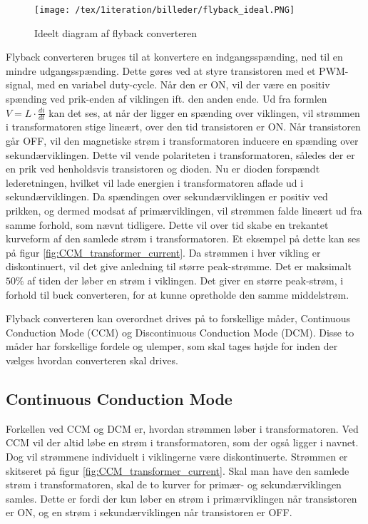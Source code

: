 \begin{figure}[H]
	\center
	\texttt{[image: /tex/1iteration/billeder/flyback\_ideal.PNG]}
	\caption{Ideelt diagram af flyback converteren
	\cite{SMPS-topologies}}
	\label{fig:flyback_ideal}
\end{figure} 

\noindent Flyback converteren bruges til at konvertere en indgangsspænding, ned til en mindre udgangsspænding. Dette gøres ved at styre transistoren med et PWM-signal, med en variabel duty-cycle. Når den er ON, vil der være en positiv spænding ved prik-enden af viklingen ift. den anden ende. Ud fra formlen $V=L\cdot \frac{di}{dt}$ kan det ses, at når der ligger en spænding over viklingen, vil strømmen i transformatoren stige lineært, over den tid transistoren er ON. Når transistoren går OFF, vil den magnetiske strøm i transformatoren inducere en spænding over sekundærviklingen. Dette vil vende polariteten i transformatoren, således der er en prik ved henholdsvis transistoren og dioden. Nu er dioden forspændt lederetningen, hvilket vil lade energien i transformatoren aflade ud i sekundærviklingen. Da spændingen over sekundærviklingen er positiv ved prikken, og dermed modsat af primærviklingen, vil strømmen falde lineært ud fra samme forhold, som nævnt tidligere. Dette vil over tid skabe en trekantet kurveform af den samlede strøm i transformatoren. Et eksempel på dette kan ses på figur \ref{fig:CCM_transformer_current}. Da strømmen i hver vikling er diskontinuert, vil det give anledning til større peak-strømme. Det er maksimalt $50\percent$ af tiden der løber en strøm i viklingen. Det giver en større peak-strøm, i forhold til buck converteren, for at kunne opretholde den samme middelstrøm.

Flyback converteren kan overordnet drives på to forskellige måder, Continuous Conduction Mode (CCM) og Discontinuous Conduction Mode (DCM). Disse to måder har forskellige fordele og ulemper, som skal tages højde for inden der vælges hvordan converteren skal drives. 

\subsection{Continuous Conduction Mode}
Forkellen ved CCM og DCM er, hvordan strømmen løber i transformatoren. Ved CCM vil der altid løbe en strøm i transformatoren, som der også ligger i navnet. Dog vil strømmene individuelt i viklingerne være diskontinuerte. Strømmen er skitseret på figur \ref{fig:CCM_transformer_current}. Skal man have den samlede strøm i transformatoren, skal de to kurver for primær- og sekundærviklingen samles. Dette er fordi der kun løber en strøm i primærviklingen når transistoren er ON, og en strøm i sekundærviklingen når transistoren er OFF. 


